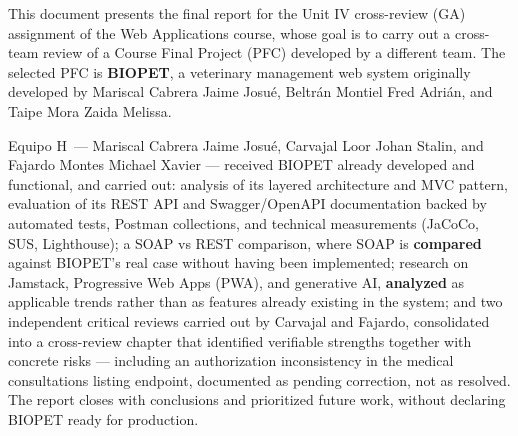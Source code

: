 \documentclass[12pt,a4paper]{report}
\newcommand{\equipoga}{Equipo H}
\begin{document}
This document presents the final report for the Unit IV cross-review (GA)
assignment of the Web Applications course, whose goal is to carry out a
cross-team review of a Course Final Project (PFC) developed by a different
team. The selected PFC is \textbf{BIOPET}, a veterinary management web
system originally developed by Mariscal Cabrera Jaime Josu\'e, Beltr\'an
Montiel Fred Adri\'an, and Taipe Mora Zaida Melissa.

\equipoga\ --- Mariscal Cabrera Jaime Josu\'e, Carvajal Loor Johan Stalin,
and Fajardo Montes Michael Xavier --- received BIOPET already developed and
functional, and carried out: analysis of its layered architecture and MVC
pattern, evaluation of its REST API and Swagger/OpenAPI documentation
backed by automated tests, Postman collections, and technical measurements
(JaCoCo, SUS, Lighthouse); a SOAP vs REST comparison, where SOAP is
\textbf{compared} against BIOPET's real case without having been
implemented; research on Jamstack, Progressive Web Apps (PWA), and
generative AI, \textbf{analyzed} as applicable trends rather than as
features already existing in the system; and two independent critical
reviews carried out by Carvajal and Fajardo, consolidated into a
cross-review chapter that identified verifiable strengths together with
concrete risks ---
including an authorization inconsistency in the medical consultations
listing endpoint, documented as pending correction, not as resolved. The
report closes with conclusions and prioritized future work, without
declaring BIOPET ready for production.

\clearpage
\tableofcontents
\clearpage

\setcounter{page}{1}











\printbibliography[title={Referencias}]
\end{document}
